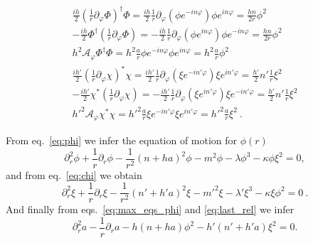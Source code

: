 \begin{eqnarray}
\frac{ih}{2}\left(\frac{1}{r}\partial_{\varphi}\Phi\right)^{\dagger}\Phi = \frac{ih}{2}\frac{1}{r}\partial_{\varphi}(\phi e^{-in\varphi})\phi e^{in\varphi} = \frac{hn}{2r}\phi^2 \nonumber \\ 
-\frac{ih}{2}\Phi^{\dagger}\left(\frac{1}{r}\partial_{\varphi}\Phi\right) = -\frac{ih}{2}\frac{1}{r}\partial_{\varphi}(\phi e^{in\varphi})\phi e^{-in\varphi} = \frac{hn}{2r}\phi^2 \nonumber \\
h^2 \mathcal{A}_{\varphi} \Phi^{\dagger}\Phi = h^2\frac{a}{r}\phi e^{-in\varphi}\phi e^{in\varphi} = h^2 \frac{a}{r}\phi^2 \nonumber \\
\frac{ih'}{2}\left(\frac{1}{r}\partial_{\varphi}\chi\right)^{*}\chi = \frac{ih'}{2}\frac{1}{r}\partial_{\varphi}(\xi e^{-in'\varphi})\xi e^{in'\varphi} = \frac{h'}{2} n'\frac{1}{r}\xi^2  \nonumber \\ 
-\frac{ih'}{2}\chi^{*}\left(\frac{1}{r}\partial_{\varphi}\chi\right) = -\frac{ih'}{2}\frac{1}{r}\partial_{\varphi}(\xi e^{in'\varphi})\xi e^{-in'\varphi} =\frac{h'}{2} n'\frac{1}{r}\xi^2\nonumber  \\
\label{eq:last_rel}
h'^2 \mathcal{A}_{\varphi} \chi^{*}\chi = h'^2\frac{a}{r}\xi e^{-in'\varphi}\xi e^{in'\varphi} = h'^2\frac{a}{r}\xi^2 \ .
\end{eqnarray}


From eq.\ \eqref{eq:phi} we infer the equation of motion for $\phi(r)$
\begin{equation}
	\label{eq:final_phi}
	\partial_r^2 \phi + \frac{1}{r} \partial_r \phi- \frac{1}{r^2}\left(n+ha\right)^2\phi- m^2 \phi- \lambda \phi^3-\kappa \phi \xi^2 = 0,
\end{equation}
and from eq.\ \eqref{eq:chi} we obtain
\begin{equation}
	\label{eq:final_xi}
	\partial_r^2 \xi + \frac{1}{r} \partial_r \xi - \frac{1}{r^2}\left(n'+h'a \right)^2\xi -m'^2\xi - \lambda' \xi^3 - \kappa \xi \phi^2 = 0\ .
\end{equation}
And finally from eqs.\ \eqref{eq:max_eqs_phi} and \eqref{eq:last_rel} we infer
\begin{equation}
	\label{eq:a}
\partial_r^2a -\frac{1}{r}\partial_r a-h(n+ha)\phi^2-h' (n'+h'a)\xi^2 = 0.
\end{equation}
